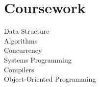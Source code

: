 \documentclass[]{hieudo-build}
\begin{document}
\begin{minipage}[t]{0.34\textwidth}
\section{Coursework}
Data Structure \\
Algorithms \\
Concurrency \\
Systems Programming \\
Compilers \\
Object-Oriented Programming\\

\sectionsep





\sectionsep
{}

%
%
\end{minipage} 
\hfill
\end{document}
